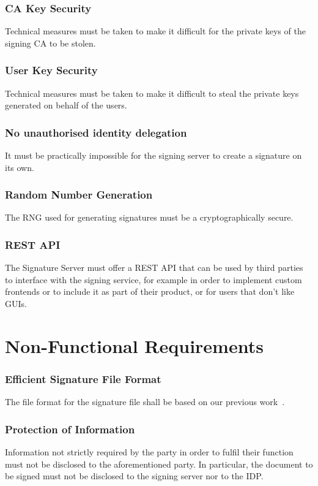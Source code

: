 \subsection{CA Key Security}
Technical measures must be taken to make it difficult for the private keys of the signing \gls{CA} to be stolen.

\subsection{User Key Security}
Technical measures must be taken to make it difficult to steal the private keys generated on behalf of the users.

\subsection{No unauthorised identity delegation}
It must be practically impossible for the signing server to create a signature on its own.

\subsection{Random Number Generation}
The \gls{RNG} used for generating signatures must be a cryptographically secure.

\subsection{REST API}
The Signature Server must offer a \gls{REST} \gls{API} that can be used by third parties to interface with the signing service,
for example in order to implement custom frontends or to include it as part of their product,
or for users that don't like \gls{GUI}s.

\chapter*{Non-Functional Requirements}
\label{ch:nonfunctionalrequirements}

\subsection{Efficient Signature File Format}
The file format for the signature file shall be based on our previous work~\cite{projekt2}.

\subsection{Protection of Information}
Information not strictly required by the party in order to fulfil their function must not be disclosed to the aforementioned party.
In particular, the document to be signed must not be disclosed to the signing server nor to the \gls{IDP}.

